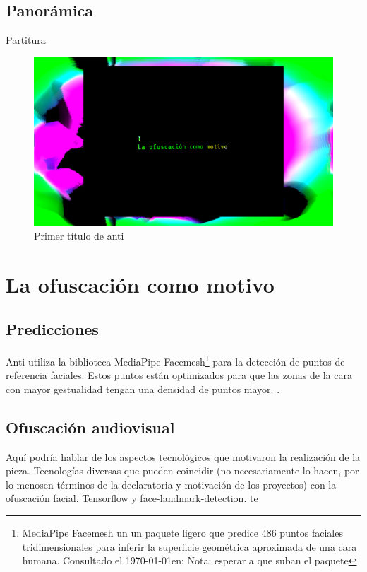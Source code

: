 \subsection{Panorámica}

Partitura

\begin{figure}[tb]
\centering 
\includegraphics[width=\columnwidth]{../img/antiHydra1.png} 
\caption[Título 1]{Primer título de anti}
\label{fig:gallery} 
\end{figure}

\section{La ofuscación como motivo}

\subsection{Predicciones}

Anti utiliza la biblioteca MediaPipe Facemesh\footnote{MediaPipe Facemesh un un paquete ligero que predice 486 puntos faciales tridimensionales para inferir la superficie geométrica aproximada de una cara humana. Consultado el \today en: Nota: esperar a que suban el paquete} para la detección de puntos de referencia faciales. Estos puntos están optimizados para que las zonas de la cara con mayor gestualidad tengan una densidad de puntos mayor. \citep{kartynnik2019realtime}.

\subsection{Ofuscación audiovisual}

Aquí podría hablar de los aspectos tecnológicos que motivaron la realización de la pieza. Tecnologías diversas que pueden coincidir (no necesariamente lo hacen, por lo menosen términos de la declaratoria y motivación de los proyectos) con la ofuscación facial. Tensorflow y face-landmark-detection. 
te

